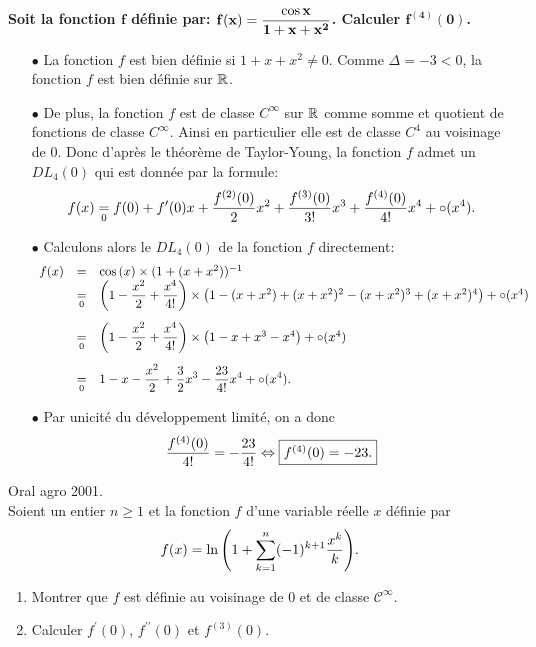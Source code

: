 \documentclass[a4paper, 11pt,reqno]{article}
\begin{document}
\begin{correction}
	\textbf{Soit la fonction $\mathbf{f}$ d\'efinie par: $\mathbf{f(x)=\displaystyle\frac{\cos{x}}{1+x+x^2}}$. Calculer $\mathbf{f^{(4)}(0)}$.}
	\begin{itemize}
		\item[$\bullet$] La fonction $f$ est bien d\'efinie si $1+x+x^2\not= 0$. Comme $\Delta=-3<0$, la fonction $f$ est bien d\'efinie sur $\mathbb{R}$.
		\item[$\bullet$] De plus, la fonction $f$ est de classe $C^{\infty}$ sur $\mathbb{R}$ comme somme et quotient de fonctions de classe $C^{\infty}$. Ainsi en particulier elle est de classe $C^4$ au voisinage de 0. Donc d'apr\`{e}s le th\'eor\`{e}me de Taylor-Young, la fonction $f$ admet un $DL_4(0)$ qui est donn\'ee par la formule:
		      $$f(x)\underset{0}{=} f(0)+f^{\prime}(0)x+\displaystyle\frac{f^{(2)}(0)}{2}x^2+\displaystyle\frac{f^{(3)}(0)}{3!}x^3+\displaystyle\frac{f^{(4)}(0)}{4!}x^4+\circ(x^4).$$
		\item[$\bullet$] Calculons alors le $DL_4(0)$ de la fonction $f$ directement:
		      $$\begin{array}{lll}
				      f(x) & =               & \cos{(x)}\times (1+(x+x^2))^{-1}                                                                                                     \\
				           & \underset{0}{=} & \left(1-\ddp\frac{x^2}{2}+\ddp\frac{x^4}{4!}    \right)\times\left( 1-(x+x^2)+(x+x^2)^2-(x+x^2)^3+(x+x^2)^4  \right)+\circ(x^4)\vsec \\
				           & \underset{0}{=} & \left(1-\ddp\frac{x^2}{2}+\ddp\frac{x^4}{4!}    \right)\times\left( 1-x+x^3-x^4  \right)+\circ(x^4)\vsec                             \\
				           & \underset{0}{=} & 1-x-\ddp\frac{x^2}{2}+\ddp\frac{3}{2}x^3-\ddp\frac{23}{4!}x^4+\circ(x^4).
			      \end{array}$$
		\item[$\bullet$] Par unicit\'e du d\'eveloppement limit\'e, on a donc
		      $$\displaystyle\frac{f^{(4)}(0)}{4!}=-\displaystyle\frac{23}{4!} \Leftrightarrow \fbox{$f^{(4)}(0)=-23$.}$$
	\end{itemize}
\end{correction}
\begin{exercice} Oral agro 2001.\\
	\noindent Soient un entier $n\geq 1$ et la fonction $f$ d'une variable r\'eelle $x$ d\'efinie par
	$$f(x)=\ln{\left( 1+\sum\limits_{k=1}^n (-1)^{k+1}  \displaystyle\frac{x^k}{k}  \right)}.$$
	\begin{enumerate}
		\item Montrer que $f$ est d\'efinie au voisinage de 0 et de classe $\mathcal{C}^{\infty}$.
		\item Calculer $f^{\prime}(0)$, $f^{\prime\prime}(0)$ et $f^{(3)}(0)$.
	\end{enumerate}
\end{exercice}
\end{document}
